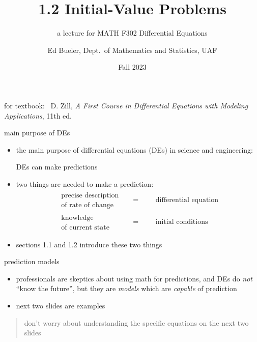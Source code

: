 \documentclass{beamer}
\title{1.2 Initial-Value Problems}
\subtitle{a lecture for MATH F302 Differential Equations}
\author{Ed Bueler, Dept.~of Mathematics and Statistics, UAF}
\date{Fall 2023}
\begin{document}


\begin{frame}
\titlepage

\centerline{\tiny for textbook: \, D. Zill, \emph{A First Course in Differential Equations with Modeling Applications}, 11th ed.}
\end{frame}


\begin{frame}{main purpose of DEs}

\begin{itemize}
\item the main purpose of differential equations (DEs) in science and engineering:

\bigskip

    \centerline{\alert{DEs can make predictions}}

\bigskip

\item two things are needed to make a prediction:
\begin{align*}
\begin{matrix}
\text{precise description} \\
\text{of rate of change}
\end{matrix} && = && &\text{differential equation} \\
\begin{matrix}
\text{knowledge} \\
\text{of current state}
\end{matrix} && = && &\text{initial conditions}
\end{align*}
\item sections 1.1 and 1.2 introduce these two things
\end{itemize}
\end{frame}


\begin{frame}{prediction models}

\begin{itemize}
\item professionals are skeptics about using math for predictions, and DEs do \emph{not} ``know the future'', but they are \emph{models} which are \emph{capable} of prediction
\item next two slides are examples
\end{itemize}

\bigskip
\begin{quote}
\alert{don't worry} about understanding the specific equations on the next two slides
\end{quote}
\end{frame}
\end{document}
